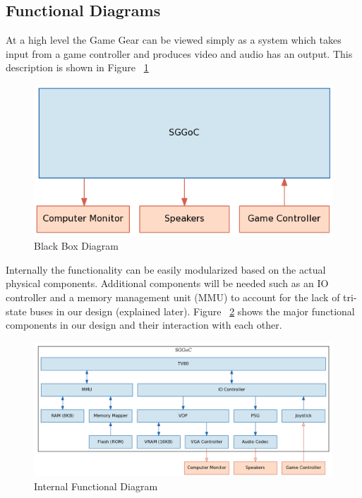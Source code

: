 \documentclass{article}
\begin{document}
\newpage
\subsection{Functional Diagrams}

At a high level the Game Gear can be viewed simply as a system which
takes input from a game controller and produces video and audio has an
output. This description is shown in Figure ~\ref{fig:external}

\begin{figure}[H]
\centering
\includegraphics[scale=0.4]{../block_diagrams/block_diagram_external.png}
\caption{Black Box Diagram}
\label{fig:external}
\end{figure}

Internally the functionality can be easily modularized based on the
actual physical components. Additional components will be needed such
as an IO controller and a memory management unit (MMU) to account for 
the lack of tri-state buses in our design (explained later). Figure
~\ref{fig:internal} shows the major functional components in our
design and their interaction with each other.

\begin{figure}[H]
\centering
\includegraphics[scale=0.4]{../block_diagrams/block_diagram_internal.png}
\caption{Internal Functional Diagram}
\label{fig:internal}
\end{figure}
\end{document}
